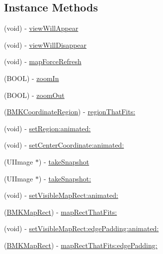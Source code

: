 \subsection*{Instance Methods}
\begin{DoxyCompactItemize}
\item 
(void) -\/ \hyperlink{interface_b_m_k_map_view_a6ce8ac560bd901b93b3e15d6996a409a}{view\+Will\+Appear}
\item 
(void) -\/ \hyperlink{interface_b_m_k_map_view_a0cfbfc217062e84de41ddb04dcad7e67}{view\+Will\+Disappear}
\item 
(void) -\/ \hyperlink{interface_b_m_k_map_view_a952993ae3b36628c1e16acf78f3b0b4a}{map\+Force\+Refresh}
\item 
(B\+O\+O\+L) -\/ \hyperlink{interface_b_m_k_map_view_a349f7c74871a389d73955edd7bcd9fdf}{zoom\+In}
\item 
(B\+O\+O\+L) -\/ \hyperlink{interface_b_m_k_map_view_a1806c818757917ef674ebe5ba24fe5a2}{zoom\+Out}
\item 
(\hyperlink{struct_b_m_k_coordinate_region}{B\+M\+K\+Coordinate\+Region}) -\/ \hyperlink{interface_b_m_k_map_view_a5a1387f64868bf341cbf743063a91d28}{region\+That\+Fits\+:}
\item 
(void) -\/ \hyperlink{interface_b_m_k_map_view_af182240990fe7ad8ff8b709456200fed}{set\+Region\+:animated\+:}
\item 
(void) -\/ \hyperlink{interface_b_m_k_map_view_a02c0933bb56354f30695a6634e416e26}{set\+Center\+Coordinate\+:animated\+:}
\item 
(U\+I\+Image $\ast$) -\/ \hyperlink{interface_b_m_k_map_view_af2af641b86f327aa9f2a16050d380db2}{take\+Snapshot}
\item 
(U\+I\+Image $\ast$) -\/ \hyperlink{interface_b_m_k_map_view_a09fa7c95a30d88f468bcd3492772d63f}{take\+Snapshot\+:}
\item 
(void) -\/ \hyperlink{interface_b_m_k_map_view_ad90d3e9ceabed218dcb90d9fc8247902}{set\+Visible\+Map\+Rect\+:animated\+:}
\item 
(\hyperlink{struct_b_m_k_map_rect}{B\+M\+K\+Map\+Rect}) -\/ \hyperlink{interface_b_m_k_map_view_a58f9c0d783d39cd0d028ae94ca408de8}{map\+Rect\+That\+Fits\+:}
\item 
(void) -\/ \hyperlink{interface_b_m_k_map_view_a1e5a69629b90ac2f571284e2e6c32397}{set\+Visible\+Map\+Rect\+:edge\+Padding\+:animated\+:}
\item 
(\hyperlink{struct_b_m_k_map_rect}{B\+M\+K\+Map\+Rect}) -\/ \hyperlink{interface_b_m_k_map_view_a93e07fbbe602a9a493650158babd2349}{map\+Rect\+That\+Fits\+:edge\+Padding\+:}

\end{DoxyCompactItemize}
